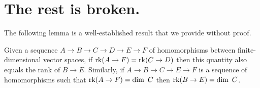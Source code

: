 \section{The rest is broken.}

The following lemma is a well-established result that we provide without proof.

\begin{lemma}\label{lem:sandwitch}
    Given a sequence $A\to B\to C\to D\to E\to F$ of homomorphisms between finite-dimensional vector spaces, if $\mathrm{rk}(A\to F) = \mathrm{rk}(C\to D)$ then this quantity also equals the rank of $B\to E$.
    Similarly, if $A\to B\to C\to E\to F$ is a sequence of homomorphisms such that $\mathrm{rk}(A\to F) = \dim~C$ then $\mathrm{rk}(B\to E) = \dim~C$.
\end{lemma}


